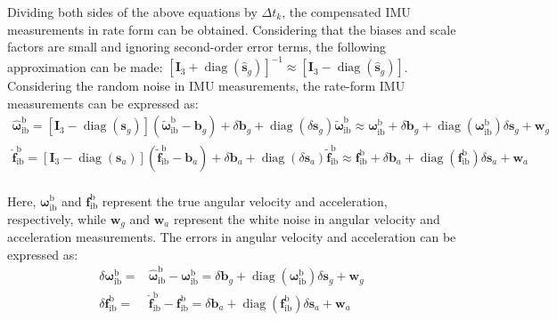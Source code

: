 \documentclass{article}
\begin{document}
Dividing both sides of the above equations by $\Delta t_k$, the compensated IMU measurements in rate form can be obtained. Considering that the biases and scale factors are small and ignoring second-order error terms, the following approximation can be made: $\left[\boldsymbol{I}_3 + \operatorname{diag}(\hat{\boldsymbol{s}}_{g})\right]^{-1} \approx \left[\boldsymbol{I}_3 - \operatorname{diag}(\hat{\boldsymbol{s}}_{g})\right]$. Considering the random noise in IMU measurements, the rate-form IMU measurements can be expressed as:
\begin{equation}
    \begin{aligned}
        \hat{\boldsymbol{\omega}}_{\mathrm{ib}}^{\mathrm{b}} = \left[\boldsymbol{I}_3 - \operatorname{diag}(\boldsymbol{s}_{g})\right] \left(\tilde{\boldsymbol{\omega}}_{\mathrm{ib}}^{\mathrm{b}} - {\boldsymbol{b}}_{g} \right) + \delta \boldsymbol{b}_{g} +  \operatorname{diag}(\delta \boldsymbol{s}_{g}) \tilde{\boldsymbol{\omega}}_{\mathrm{ib}}^{\mathrm{b}} \approx \boldsymbol{\omega}_{\mathrm{ib}}^{\mathrm{b}} + \delta \boldsymbol{b}_{g} + \operatorname{diag}(\boldsymbol{\omega}_{\mathrm{ib}}^{\mathrm{b}}) \delta \boldsymbol{s}_{g}  + \boldsymbol{w}_{g} \\
        \hat{\boldsymbol{f}}_{\mathrm{ib}}^{\mathrm{b}} = \left[\boldsymbol{I}_3 - \operatorname{diag}(\boldsymbol{s}_{a})\right] \left(\tilde{\boldsymbol{f}}_{\mathrm{ib}}^{\mathrm{b}} - {\boldsymbol{b}}_{a} \right) + \delta \boldsymbol{b}_{a} +  \operatorname{diag}(\delta \boldsymbol{s}_{a}) \tilde{\boldsymbol{f}}_{\mathrm{ib}}^{\mathrm{b}} \approx \boldsymbol{f}_{\mathrm{ib}}^{\mathrm{b}} + \delta \boldsymbol{b}_{a} + \operatorname{diag}(\boldsymbol{f}_{\mathrm{ib}}^{\mathrm{b}}) \delta \boldsymbol{s}_{a}  + \boldsymbol{w}_{a} \\
    \end{aligned}
\end{equation}

Here, $\boldsymbol{\omega}_{\mathrm{ib}}^{\mathrm{b}}$ and $\boldsymbol{f}_{\mathrm{ib}}^{\mathrm{b}}$ represent the true angular velocity and acceleration, respectively, while $\boldsymbol{w}_{g}$ and $\boldsymbol{w}_{a}$ represent the white noise in angular velocity and acceleration measurements. The errors in angular velocity and acceleration can be expressed as:
\begin{equation}
    \begin{aligned}
        \delta \boldsymbol{\omega}_{\mathrm{ib}}^{\mathrm{b}} =& \hat{\boldsymbol{\omega}}_{\mathrm{ib}}^{\mathrm{b}} - \boldsymbol{\omega}_{\mathrm{ib}}^{\mathrm{b}} = \delta \boldsymbol{b}_{g} + \operatorname{diag}(\boldsymbol{\omega}_{\mathrm{ib}}^{\mathrm{b}}) \delta \boldsymbol{s}_{g} + \boldsymbol{w}_{g} \\
        \delta \boldsymbol{f}_{\mathrm{ib}}^{\mathrm{b}} =& \hat{\boldsymbol{f}}_{\mathrm{ib}}^{\mathrm{b}} - \boldsymbol{f}_{\mathrm{ib}}^{\mathrm{b}} = \delta \boldsymbol{b}_{a} + \operatorname{diag}(\boldsymbol{f}_{\mathrm{ib}}^{\mathrm{b}}) \delta \boldsymbol{s}_{a} + \boldsymbol{w}_{a}
    \end{aligned}
    \label{eq:acceleration-angular-velocity-error-definition}
\end{equation}
\end{document}
